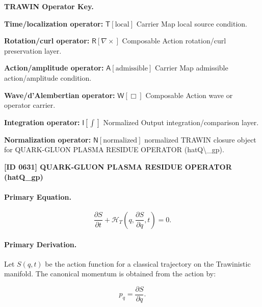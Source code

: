 \par\vspace{0.45\baselineskip}
\noindent\begin{minipage}[t]{\linewidth}
\begingroup
\small
\raggedright
\textbf{TRAWIN Operator Key.}\par
\noindent\textbf{Time/localization operator:} $\mathsf{T}\!\left[\mathrm{local}\right]$ Carrier Map local source condition.\par
\noindent\textbf{Rotation/curl operator:} $\mathsf{R}\!\left[\nabla\times\right]$ Composable Action rotation/curl preservation layer.\par
\noindent\textbf{Action/amplitude operator:} $\mathsf{A}\!\left[\mathrm{admissible}\right]$ Carrier Map admissible action/amplitude condition.\par
\noindent\textbf{Wave/d'Alembertian operator:} $\mathsf{W}\!\left[\Box\right]$ Composable Action wave or operator carrier.\par
\noindent\textbf{Integration operator:} $\mathsf{I}\!\left[\int\right]$ Normalized Output integration/comparison layer.\par
\noindent\textbf{Normalization operator:} $\mathsf{N}\!\left[\mathrm{normalized}\right]$ normalized TRAWIN closure object for QUARK-GLUON PLASMA RESIDUE OPERATOR (hatQ\textbackslash{}\_gp).\par
\endgroup
\end{minipage}

\clearpage
\noindent\textbf{[ID 0631] QUARK-GLUON PLASMA RESIDUE OPERATOR (hatQ\_gp)}\par
\vspace{0.35em}
\paragraph{Primary Equation.}
\begin{equation}
\frac{\partial S}{\partial t}
+
\mathcal{H}_T
\left(
q,\frac{\partial S}{\partial q},t
\right)
=
0 .
\end{equation}

\paragraph{Primary Derivation.}
Let $S(q,t)$ be the action function for a classical trajectory on the Trawinistic manifold.  
The canonical momentum is obtained from the action by:

\begin{equation}
p_q=\frac{\partial S}{\partial q}.
\end{equation}

